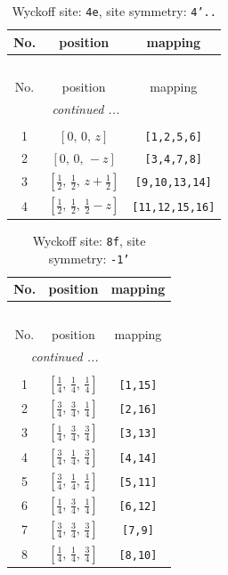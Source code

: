 \documentclass[fleqn,8pt]{jsarticle}
\begin{document}
\renewcommand{\arraystretch}{1.2}
\begin{longtable}{ccc}
\caption{Wyckoff site: {\tt 4e}, site symmetry: {\tt 4'..}}
 \\
 \hline \hline
No. & position & mapping \\ \hline \endfirsthead

\multicolumn{2}{l}{\tablename\ \thetable{}} \\
 \hline \hline
No. & position & mapping \\ \hline \endhead

 \hline \hline
\multicolumn{2}{r}{\footnotesize\it continued ...} \\ \endfoot

 \hline \hline
\multicolumn{2}{r}{} \\ \endlastfoot

1 & $\left[ 0,\, 0,\, z \right]$ & {\tt [1,2,5,6]} \\ \hline
2 & $\left[ 0,\, 0,\, - z \right]$ & {\tt [3,4,7,8]} \\ \hline
3 & $\left[ \frac{1}{2},\, \frac{1}{2},\, z + \frac{1}{2} \right]$ & {\tt [9,10,13,14]} \\ \hline
4 & $\left[ \frac{1}{2},\, \frac{1}{2},\, \frac{1}{2} - z \right]$ & {\tt [11,12,15,16]} \\
\end{longtable}
\renewcommand{\arraystretch}{1.2}
\begin{longtable}{ccc}
\caption{Wyckoff site: {\tt 8f}, site symmetry: {\tt -1'}}
 \\
 \hline \hline
No. & position & mapping \\ \hline \endfirsthead

\multicolumn{2}{l}{\tablename\ \thetable{}} \\
 \hline \hline
No. & position & mapping \\ \hline \endhead

 \hline \hline
\multicolumn{2}{r}{\footnotesize\it continued ...} \\ \endfoot

 \hline \hline
\multicolumn{2}{r}{} \\ \endlastfoot

1 & $\left[ \frac{1}{4},\, \frac{1}{4},\, \frac{1}{4} \right]$ & {\tt [1,15]} \\ \hline
2 & $\left[ \frac{3}{4},\, \frac{3}{4},\, \frac{1}{4} \right]$ & {\tt [2,16]} \\ \hline
3 & $\left[ \frac{1}{4},\, \frac{3}{4},\, \frac{3}{4} \right]$ & {\tt [3,13]} \\ \hline
4 & $\left[ \frac{3}{4},\, \frac{1}{4},\, \frac{3}{4} \right]$ & {\tt [4,14]} \\ \hline
5 & $\left[ \frac{3}{4},\, \frac{1}{4},\, \frac{1}{4} \right]$ & {\tt [5,11]} \\ \hline
6 & $\left[ \frac{1}{4},\, \frac{3}{4},\, \frac{1}{4} \right]$ & {\tt [6,12]} \\ \hline
7 & $\left[ \frac{3}{4},\, \frac{3}{4},\, \frac{3}{4} \right]$ & {\tt [7,9]} \\ \hline
8 & $\left[ \frac{1}{4},\, \frac{1}{4},\, \frac{3}{4} \right]$ & {\tt [8,10]} \\
\end{longtable}
\end{document}

